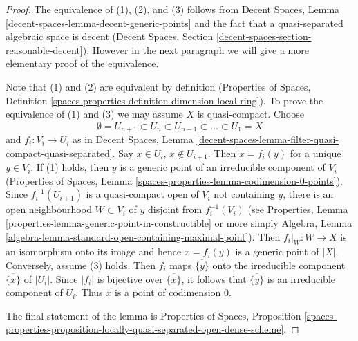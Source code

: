 \documentclass[10pt,a4paper]{amsart}
\theoremstyle{plain}
\theoremstyle{definition}
\theoremstyle{remark}
\numberwithin{equation}{subsection}
\begin{document}
\begin{proof}
The equivalence of (1), (2), and (3) follows from
Decent Spaces, Lemma \ref{decent-spaces-lemma-decent-generic-points}
and the fact that a quasi-separated algebraic space is decent
(Decent Spaces, Section \ref{decent-spaces-section-reasonable-decent}).
However in the next paragraph we will give a more elementary proof of the
equivalence.

\medskip\noindent
Note that (1) and (2) are equivalent by definition
(Properties of Spaces, Definition
\ref{spaces-properties-definition-dimension-local-ring}).
To prove the equivalence of (1) and (3) we may assume $X$ is quasi-compact.
Choose
$$
\emptyset = U_{n + 1} \subset
U_n \subset U_{n - 1} \subset \ldots \subset U_1 = X
$$
and $f_i : V_i \to U_i$ as in Decent Spaces, Lemma
\ref{decent-spaces-lemma-filter-quasi-compact-quasi-separated}.
Say $x \in U_i$, $x \not \in U_{i + 1}$. Then $x = f_i(y)$ for
a unique $y \in V_i$. If (1) holds, then $y$ is a generic point of
an irreducible component of $V_i$ (Properties of Spaces, Lemma
\ref{spaces-properties-lemma-codimension-0-points}).
Since $f_i^{-1}(U_{i + 1})$ is a quasi-compact open of $V_i$
not containing $y$, there is an open neighbourhood $W \subset V_i$
of $y$ disjoint from $f_i^{-1}(V_i)$
(see
Properties, Lemma \ref{properties-lemma-generic-point-in-constructible}
or more simply Algebra, Lemma
\ref{algebra-lemma-standard-open-containing-maximal-point}).
Then $f_i|_W : W \to X$ is an isomorphism onto its image and hence
$x = f_i(y)$ is a generic point of $|X|$. Conversely, assume (3) holds.
Then $f_i$ maps $\overline{\{y\}}$ onto the irreducible component
$\overline{\{x\}}$ of $|U_i|$. Since $|f_i|$ is bijective over
$\overline{\{x\}}$, it follows that $\overline{\{y\}}$
is an irreducible component of $U_i$. Thus $x$ is a point of
codimension $0$.

\medskip\noindent
The final statement of the lemma is
Properties of Spaces, Proposition
\ref{spaces-properties-proposition-locally-quasi-separated-open-dense-scheme}.
\end{proof}
\end{document}
